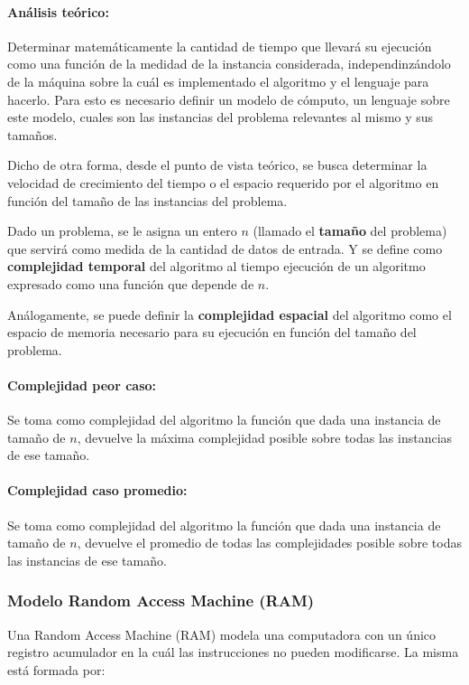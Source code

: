 \paragraph{Análisis teórico:} Determinar matemáticamente la cantidad de tiempo que llevará su ejecución como una función de la medidad de la instancia considerada, independinzándolo de la máquina sobre la cuál es implementado el algoritmo y el lenguaje para hacerlo. Para esto es necesario definir un modelo de cómputo, un lenguaje sobre este modelo, cuales son las instancias del problema relevantes al mismo y sus tamaños.

Dicho de otra forma, desde el punto de vista teórico, se busca determinar la velocidad de crecimiento del tiempo o el espacio requerido por el algoritmo en función del tamaño de las instancias del problema.

Dado un problema, se le asigna un entero \(n\) (llamado el \textbf{tamaño} del problema) que servirá como medida de la cantidad de datos de entrada. Y se define como \textbf{complejidad temporal} del algoritmo al tiempo ejecución de un algoritmo expresado como una función que depende de \(n\).

Análogamente, se puede definir la \textbf{complejidad espacial} del algoritmo como el espacio de memoria necesario para su ejecución en función del tamaño del problema.

\paragraph{Complejidad peor caso:} Se toma como complejidad del algoritmo la función que dada una instancia de tamaño de $n$, devuelve la máxima complejidad posible sobre todas las instancias de ese tamaño.

\paragraph{Complejidad caso promedio:} Se toma como complejidad del algoritmo la función que dada una instancia de tamaño de $n$, devuelve el promedio de todas las complejidades posible sobre todas las instancias de ese tamaño.

\subsubsection{Modelo Random Access Machine (RAM)}
Una Random Access Machine (RAM) modela una computadora con un único registro acumulador en la cuál las instrucciones no pueden modificarse. La misma está formada por:

